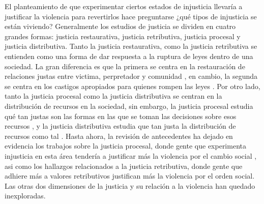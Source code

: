 \documentclass[12pt,twoside]{templates/facsothesis}
\begin{document}
El planteamiento de que experimentar ciertos estados de injusticia llevaría a justificar la violencia para revertirlos hace preguntarse ¿qué tipos de injusticia se están viviendo? Generalmente los estudios de justicia se dividen en cuatro grandes formas: justicia restaurativa, justicia retributiva, justicia procesal y justicia distributiva. Tanto la justicia restaurativa, como la justicia retributiva se entienden como una forma de dar respuesta a la ruptura de leyes dentro de una sociedad. La gran diferencia es que la primera se centra en la restauración de relaciones justas entre victima, perpretador y comunidad \citep{Cohen2016}, en cambio, la segunda se centra en los castigos apropiados para quienes rompen las leyes \citep{Wenzel2016}. Por otro lado, tanto la justicia procesal como la justicia distributiva se centran en la distribución de recursos en la sociedad, sin embargo, la justicia procesal estudia qué tan justas son las formas en las que se toman las decisiones sobre esos recursos \citep{Vermunt2016}, y la justicia distributiva estudia que tan justa la distribución de recursos como tal \citep{Jasso2016}. Hasta ahora, la revisión de antecedentes ha dejado en evidencia los trabajos sobre la justicia procesal, donde gente que experimenta injusticia en esta área tendería a justificar más la violencia por el cambio social \citep{Gerber2017b}, asi como los hallazgos relacionados a la justicia retributiva, donde gente que adhiere más a valores retributivos justifican más la violencia por el orden social. Las otras dos dimensiones de la justicia y su relación a la violencia han quedado inexploradas.
\end{document}
